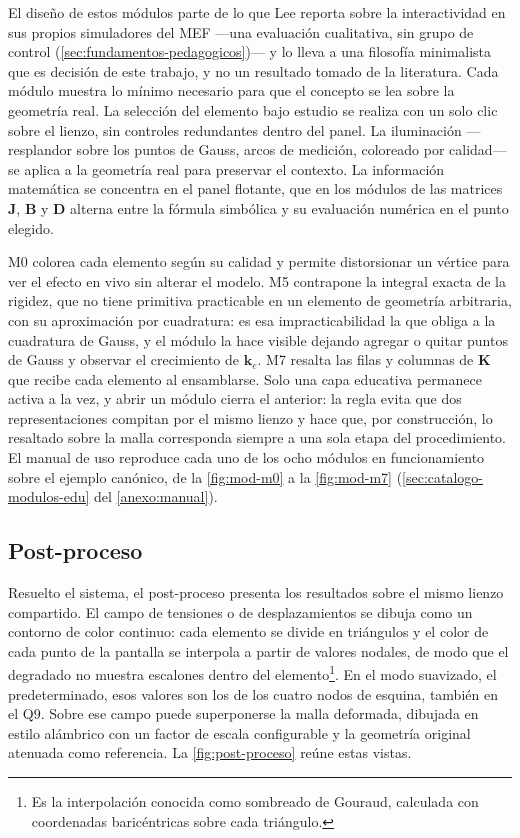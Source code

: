 El diseño de estos módulos parte de lo que Lee reporta sobre la interactividad en sus propios simuladores del MEF \autocite[pp.~158, 166]{lee2015interactive} —una evaluación cualitativa, sin grupo de control (\autoref{sec:fundamentos-pedagogicos})— y lo lleva a una filosofía minimalista que es decisión de este trabajo, y no un resultado tomado de la literatura. Cada módulo muestra lo mínimo necesario para que el concepto se lea sobre la geometría real. La selección del elemento bajo estudio se realiza con un solo clic sobre el lienzo, sin controles redundantes dentro del panel. La iluminación —resplandor sobre los puntos de Gauss, arcos de medición, coloreado por calidad— se aplica a la geometría real para preservar el contexto. La información matemática se concentra en el panel flotante, que en los módulos de las matrices $\bm{J}$, $\bm{B}$ y $\bm{D}$ alterna entre la fórmula simbólica y su evaluación numérica en el punto elegido.

M0 colorea cada elemento según su calidad y permite distorsionar un vértice para ver el efecto en vivo sin alterar el modelo. M5 contrapone la integral exacta de la rigidez, que no tiene primitiva practicable en un elemento de geometría arbitraria, con su aproximación por cuadratura: es esa impracticabilidad la que obliga a la cuadratura de Gauss, y el módulo la hace visible dejando agregar o quitar puntos de Gauss y observar el crecimiento de $\bm{k}_e$. M7 resalta las filas y columnas de $\bm{K}$ que recibe cada elemento al ensamblarse. Solo una capa educativa permanece activa a la vez, y abrir un módulo cierra el anterior: la regla evita que dos representaciones compitan por el mismo lienzo y hace que, por construcción, lo resaltado sobre la malla corresponda siempre a una sola etapa del procedimiento. El manual de uso reproduce cada uno de los ocho módulos en funcionamiento sobre el ejemplo canónico, de la \autoref{fig:mod-m0} a la \autoref{fig:mod-m7} (\autoref{sec:catalogo-modulos-edu} del \autoref{anexo:manual}).

\subsection{Post-proceso}
\label{sec:post-proceso}

Resuelto el sistema, el post-proceso presenta los resultados sobre el mismo lienzo compartido. El campo de tensiones o de desplazamientos se dibuja como un contorno de color continuo: cada elemento se divide en triángulos y el color de cada punto de la pantalla se interpola a partir de valores nodales, de modo que el degradado no muestra escalones dentro del elemento\footnote{Es la interpolación conocida como sombreado de Gouraud, calculada con coordenadas baricéntricas sobre cada triángulo.}. En el modo suavizado, el predeterminado, esos valores son los de los cuatro nodos de esquina, también en el Q9. Sobre ese campo puede superponerse la malla deformada, dibujada en estilo alámbrico con un factor de escala configurable y la geometría original atenuada como referencia. La \autoref{fig:post-proceso} reúne estas vistas.

